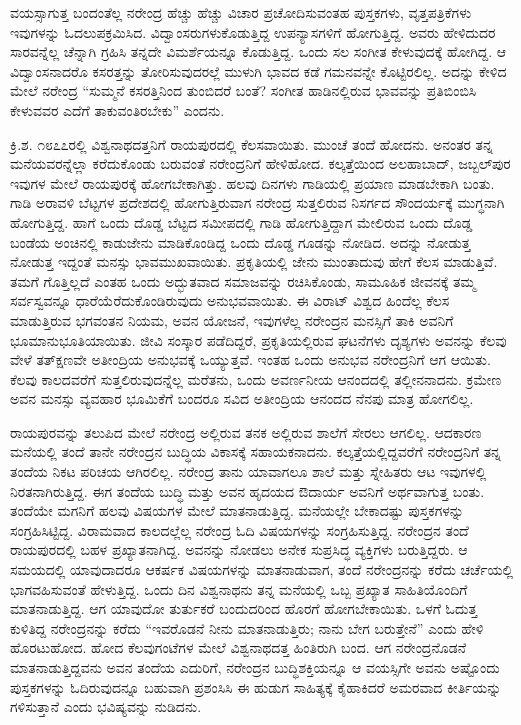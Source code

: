 ವಯಸ್ಸಾಗುತ್ತ ಬಂದಂತೆಲ್ಲ ನರೇಂದ್ರ ಹೆಚ್ಚು ಹೆಚ್ಚು ವಿಚಾರ ಪ್ರಚೋದಿಸುವಂತಹ ಪುಸ್ತಕಗಳು, ವೃತ್ತಪತ್ರಿಕೆಗಳು ಇವುಗಳನ್ನು ಓದಲುಪಕ್ರಮಿಸಿದ. ವಿದ್ವಾಂಸರುಗಳು\break ಕೊಡುತ್ತಿದ್ದ ಉಪನ್ಯಾಸಗಳಿಗೆ ಹೋಗುತ್ತಿದ್ದ. ಅವರು ಹೇಳಿದುದರ ಸಾರವನ್ನೆಲ್ಲ ಚೆನ್ನಾಗಿ ಗ್ರಹಿಸಿ ತನ್ನದೇ ವಿಮರ್ಶೆಯನ್ನೂ ಕೊಡುತ್ತಿದ್ದ. ಒಂದು ಸಲ ಸಂಗೀತ ಕೇಳುವುದಕ್ಕೆ ಹೋಗಿದ್ದ. ಆ ವಿದ್ವಾಂಸನಾದರೊ ಕಸರತ್ತನ್ನು ತೋರಿಸುವುದರಲ್ಲೆ ಮುಳುಗಿ ಭಾವದ ಕಡೆ ಗಮನವನ್ನೇ ಕೊಟ್ಟಿರಲಿಲ್ಲ. ಅದನ್ನು ಕೇಳಿದ ಮೇಲೆ ನರೇಂದ್ರ “ಸುಮ್ಮನೆ ಕಸರತ್ತಿನಿಂದ ತುಂಬಿದರೆ ಬಂತೆ? ಸಂಗೀತ ಹಾಡಿನಲ್ಲಿರುವ ಭಾವವನ್ನು ಪ್ರತಿಬಿಂಬಿಸಿ ಕೇಳುವವರ ಎದೆಗೆ ತಾಕುವಂತಿರಬೇಕು” ಎಂದನು.

ಕ್ರಿ.ಶ. ೧೮೭೭ರಲ್ಲಿ ವಿಶ್ವನಾಥದತ್ತನಿಗೆ ರಾಯಪುರದಲ್ಲಿ ಕೆಲಸವಾಯಿತು. ಮುಂಚೆ ತಂದೆ ಹೋದನು. ಅನಂತರ ತನ್ನ ಮನೆಯವರನ್ನೆಲ್ಲಾ ಕರೆದುಕೊಂಡು ಬರುವಂತೆ ನರೇಂದ್ರನಿಗೆ ಹೇಳಿಹೋದ. ಕಲ್ಕತ್ತೆಯಿಂದ ಅಲಹಾಬಾದ್, ಜಬ್ಬಲ್‍ಪುರ ಇವುಗಳ ಮೇಲೆ ರಾಯಪುರಕ್ಕೆ ಹೋಗಬೇಕಾಗಿತ್ತು. ಹಲವು ದಿನಗಳು ಗಾಡಿಯಲ್ಲಿ ಪ್ರಯಾಣ ಮಾಡಬೇಕಾಗಿ ಬಂತು. ಗಾಡಿ ಅರಾವಳಿ ಬೆಟ್ಟಗಳ ಪ್ರದೇಶದಲ್ಲಿ ಹೋಗುತ್ತಿರುವಾಗ ನರೇಂದ್ರ ಸುತ್ತಲಿರುವ ನಿಸರ್ಗದ ಸೌಂದರ್ಯಕ್ಕೆ ಮುಗ್ಧನಾಗಿ ಹೋಗುತ್ತಿದ್ದ. ಹಾಗೆ ಒಂದು ದೊಡ್ಡ ಬೆಟ್ಟದ ಸಮೀಪದಲ್ಲಿ ಗಾಡಿ ಹೋಗುತ್ತಿದ್ದಾಗ ಮೇಲಿರುವ ಒಂದು ದೊಡ್ಡ ಬಂಡೆಯ ಅಂಚಿನಲ್ಲಿ ಕಾಡುಜೇನು ಮಾಡಿಕೊಂಡಿದ್ದ ಒಂದು ದೊಡ್ಡ ಗೂಡನ್ನು ನೋಡಿದ. ಅದನ್ನು ನೋಡುತ್ತ ನೋಡುತ್ತ ಇದ್ದಂತೆ ಮನಸ್ಸು ಭಾವಮುಖವಾಯಿತು. ಪ್ರಕೃತಿಯಲ್ಲಿ ಜೇನು ಮುಂತಾದುವು ಹೇಗೆ ಕೆಲಸ ಮಾಡುತ್ತಿವೆ. ತಮಗೆ ಗೊತ್ತಿಲ್ಲದೆ ಎಂತಹ ಒಂದು ಅದ್ಭುತವಾದ ಸಮಾಜವನ್ನು ರಚಿಸಿಕೊಂಡು, ಸಾಮೂಹಿಕ ಜೀವನಕ್ಕೆ ತಮ್ಮ ಸರ್ವಸ್ವವನ್ನೂ ಧಾರೆಯೆರೆದುಕೊಂಡಿರುವುದು ಅನುಭವವಾಯಿತು. ಈ ವಿರಾಟ್ ವಿಶ್ವದ ಹಿಂದೆಲ್ಲ ಕೆಲಸ ಮಾಡುತ್ತಿರುವ ಭಗವಂತನ ನಿಯಮ, ಅವನ ಯೋಜನೆ, ಇವುಗಳೆಲ್ಲ ನರೇಂದ್ರನ ಮನಸ್ಸಿಗೆ ತಾಕಿ ಅವನಿಗೆ ಭೂಮಾನುಭೂತಿಯಾಯಿತು. ಜೀವಿ ಸಂಸ್ಕಾರ ಪಡೆದಿದ್ದರೆ, ಪ್ರಕೃತಿಯಲ್ಲಿರುವ ಘಟನೆಗಳು ದೃಶ್ಯಗಳು ಅವನನ್ನು ಕೆಲವು ವೇಳೆ ತತ್‍ಕ್ಷಣವೇ ಅತೀಂದ್ರಿಯ ಅನುಭವಕ್ಕೆ ಒಯ್ಯುತ್ತವೆ. ಇಂತಹ ಒಂದು ಅನುಭವ ನರೇಂದ್ರನಿಗೆ ಆಗ ಆಯಿತು. ಕೆಲವು ಕಾಲದವರೆಗೆ ಸುತ್ತಲಿರುವುದನ್ನೆಲ್ಲ ಮರೆತನು, ಒಂದು ಅವರ್ಣನೀಯ ಆನಂದದಲ್ಲಿ ತಲ್ಲೀನನಾದನು. ಕ್ರಮೇಣ ಅವನ ಮನಸ್ಸು ವ್ಯವಹಾರ ಭೂಮಿಕೆಗೆ ಬಂದರೂ ಸವಿದ ಅತೀಂದ್ರಿಯ ಆನಂದದ ನೆನಪು ಮಾತ್ರ ಹೋಗಲಿಲ್ಲ.

ರಾಯಪುರವನ್ನು ತಲುಪಿದ ಮೇಲೆ ನರೇಂದ್ರ ಅಲ್ಲಿರುವ ತನಕ ಅಲ್ಲಿರುವ ಶಾಲೆಗೆ ಸೇರಲು ಆಗಲಿಲ್ಲ. ಆದಕಾರಣ ಮನೆಯಲ್ಲಿ ತಂದೆ ತಾನೇ ನರೇಂದ್ರನ ಬುದ್ಧಿಯ ವಿಕಾಸಕ್ಕೆ ಸಹಾಯಕನಾದನು. ಕಲ್ಕತ್ತೆಯಲ್ಲಿದ್ದವರೆಗೆ ನರೇಂದ್ರನಿಗೆ ತನ್ನ ತಂದೆಯ ನಿಕಟ ಪರಿಚಯ ಆಗಿರಲಿಲ್ಲ. ನರೇಂದ್ರ ತಾನು ಯಾವಾಗಲೂ ಶಾಲೆ ಮತ್ತು ಸ್ನೇಹಿತರು ಆಟ ಇವುಗಳಲ್ಲಿ ನಿರತನಾಗಿರುತ್ತಿದ್ದ. ಈಗ ತಂದೆಯ ಬುದ್ಧಿ ಮತ್ತು ಅವನ ಹೃದಯದ ಔದಾರ್ಯ ಅವನಿಗೆ ಅರ್ಥವಾಗುತ್ತ ಬಂತು. ತಂದೆಯೇ ಮಗನಿಗೆ ಹಲವು ವಿಷಯಗಳ ಮೇಲೆ ಮಾತನಾಡುತ್ತಿದ್ದ. ಮನೆಯಲ್ಲೇ ಬೇಕಾದಷ್ಟು ಪುಸ್ತಕಗಳನ್ನು ಸಂಗ್ರಹಿಸಿಟ್ಟಿದ್ದ. ವಿರಾಮವಾದ ಕಾಲದಲ್ಲೆಲ್ಲ ನರೇಂದ್ರ ಓದಿ ವಿಷಯಗಳನ್ನು ಸಂಗ್ರಹಿಸುತ್ತಿದ್ದ. ನರೇಂದ್ರನ ತಂದೆ ರಾಯಪುರದಲ್ಲಿ ಬಹಳ ಪ್ರಖ್ಯಾತನಾಗಿದ್ದ. ಅವನನ್ನು ನೋಡಲು ಅನೇಕ ಸುಪ್ರಸಿದ್ಧ ವ್ಯಕ್ತಿಗಳು ಬರುತ್ತಿದ್ದರು. ಆ ಸಮಯದಲ್ಲಿ ಯಾವುದಾದರೂ ಆಕರ್ಷಕ ವಿಷಯಗಳನ್ನು ಮಾತನಾಡುವಾಗ, ತಂದೆ ನರೇಂದ್ರನನ್ನು ಕರೆದು ಚರ್ಚೆಯಲ್ಲಿ ಭಾಗವಹಿಸುವಂತೆ ಹೇಳುತ್ತಿದ್ದ. ಒಂದು ದಿನ ವಿಶ್ವನಾಥನು ತನ್ನ ಮನೆಯಲ್ಲಿ ಒಬ್ಬ ಪ್ರಖ್ಯಾತ ಸಾಹಿತಿಯೊಂದಿಗೆ ಮಾತನಾಡುತ್ತಿದ್ದ. ಆಗ ಯಾವುದೋ ತುರ್ತುಕರೆ ಬಂದುದರಿಂದ ಹೊರಗೆ ಹೋಗಬೇಕಾಯಿತು. ಒಳಗೆ ಓದುತ್ತ ಕುಳಿತಿದ್ದ ನರೇಂದ್ರನನ್ನು ಕರೆದು “ಇವರೊಡನೆ ನೀನು ಮಾತನಾಡುತ್ತಿರು; ನಾನು ಬೇಗ ಬರುತ್ತೇನೆ” ಎಂದು ಹೇಳಿ ಹೊರಟುಹೋದ. ಹೋದ ಕೆಲವುಗಂಟೆಗಳ ಮೇಲೆ ವಿಶ್ವನಾಥದತ್ತ ಹಿಂತಿರುಗಿ ಬಂದ. ಆಗ ನರೇಂದ್ರನೊಡನೆ ಮಾತನಾಡುತ್ತಿದ್ದವನು ಅವನ ತಂದೆಯ ಎದುರಿಗೆ, ನರೇಂದ್ರನ ಬುದ್ಧಿಶಕ್ತಿಯನ್ನೂ ಆ ವಯಸ್ಸಿಗೇ ಅವನು ಅಷ್ಟೊಂದು ಪುಸ್ತಕಗಳನ್ನು ಓದಿರುವುದನ್ನೂ ಬಹುವಾಗಿ ಪ್ರಶಂಸಿಸಿ ಈ ಹುಡುಗ ಸಾಹಿತ್ಯಕ್ಕೆ ಕೈಹಾಕಿದರೆ ಅಮರವಾದ ಕೀರ್ತಿಯನ್ನು ಗಳಿಸುತ್ತಾನೆ ಎಂದು ಭವಿಷ್ಯವನ್ನು ನುಡಿದನು.

